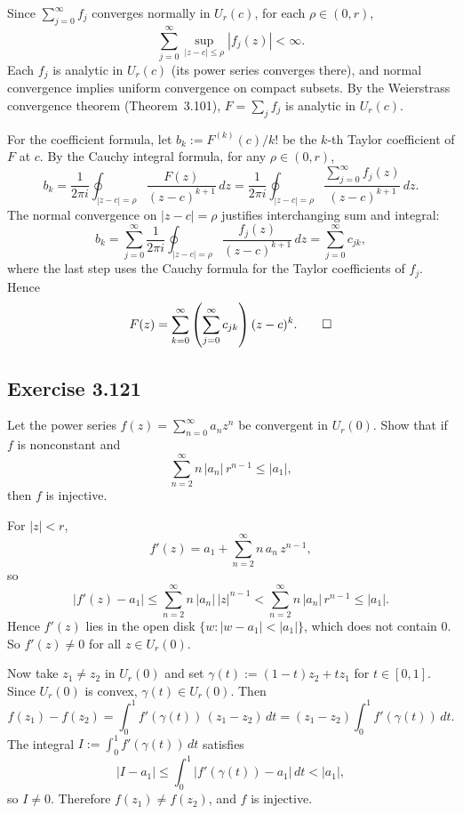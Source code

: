 \documentclass{article}
\begin{document}
\begin{solution}
  Since $\sum_{j=0}^{\infty} f_j$ converges normally in $U_r(c)$,
  for each $\rho \in (0,r)$,
  \[
    \sum_{j=0}^{\infty} \sup_{|z-c|\le\rho}|f_j(z)| < \infty.
  \]
  Each $f_j$ is analytic in $U_r(c)$ (its power series converges
  there), and normal convergence implies uniform convergence on
  compact subsets.
  By the Weierstrass convergence theorem (Theorem~3.101),
  $F = \sum_j f_j$ is analytic in $U_r(c)$.

  For the coefficient formula, let
  $b_k := F^{(k)}(c)/k!$ be the $k$-th Taylor coefficient of $F$
  at $c$.
  By the Cauchy integral formula, for any $\rho \in (0,r)$,
  \[
    b_k = \frac{1}{2\pi i}\oint_{|z-c|=\rho}
    \frac{F(z)}{(z-c)^{k+1}}\,dz
    = \frac{1}{2\pi i}\oint_{|z-c|=\rho}
    \frac{\sum_{j=0}^{\infty} f_j(z)}{(z-c)^{k+1}}\,dz.
  \]
  The normal convergence on $|z-c| = \rho$ justifies interchanging
  sum and integral:
  \[
    b_k = \sum_{j=0}^{\infty}
    \frac{1}{2\pi i}\oint_{|z-c|=\rho}
    \frac{f_j(z)}{(z-c)^{k+1}}\,dz
    = \sum_{j=0}^{\infty} c_{jk},
  \]
  where the last step uses the Cauchy formula for the Taylor
  coefficients of $f_j$.
  Hence
  \[
    F(z) = \sum_{k=0}^{\infty}
    \left(\sum_{j=0}^{\infty} c_{jk}\right)(z-c)^k.\qedhere
  \]
\end{solution}

\subsection{Exercise 3.121}

Let the power series $f(z) = \sum_{n=0}^{\infty} a_n z^n$
be convergent in $U_r(0)$.
Show that if $f$ is nonconstant and
\[
  \sum_{n=2}^{\infty} n\,|a_n|\,r^{n-1} \le |a_1|,
\]
then $f$ is injective.

\begin{solution}
  For $|z| < r$,
  \[
    f'(z) = a_1 + \sum_{n=2}^{\infty} n\,a_n\,z^{n-1},
  \]
  so
  \[
    |f'(z) - a_1|
    \le \sum_{n=2}^{\infty} n\,|a_n|\,|z|^{n-1}
    < \sum_{n=2}^{\infty} n\,|a_n|\,r^{n-1}
    \le |a_1|.
  \]
  Hence $f'(z)$ lies in the open disk
  $\{w : |w - a_1| < |a_1|\}$, which does not contain $0$.
  So $f'(z) \ne 0$ for all $z \in U_r(0)$.

  Now take $z_1 \ne z_2$ in $U_r(0)$ and set
  $\gamma(t) := (1-t)z_2 + tz_1$ for $t \in [0,1]$.
  Since $U_r(0)$ is convex, $\gamma(t) \in U_r(0)$.
  Then
  \[
    f(z_1) - f(z_2)
    = \int_0^1 f'(\gamma(t))\,(z_1 - z_2)\,dt
    = (z_1 - z_2)\int_0^1 f'(\gamma(t))\,dt.
  \]
  The integral $I := \int_0^1 f'(\gamma(t))\,dt$ satisfies
  \[
    |I - a_1|
    \le \int_0^1 |f'(\gamma(t)) - a_1|\,dt
    < |a_1|,
  \]
  so $I \ne 0$.
  Therefore $f(z_1) \ne f(z_2)$, and $f$ is injective.\qedhere
\end{solution}
\end{document}

